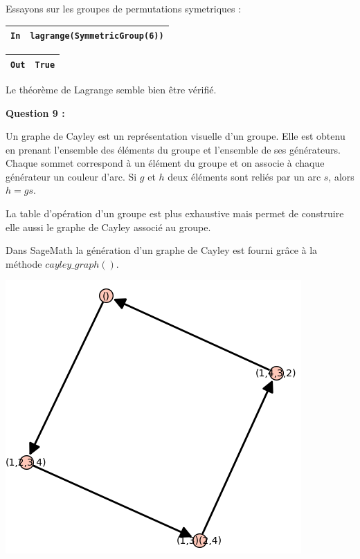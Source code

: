 \documentclass[titlepage]{article}
\begin{document}
    Essayons sur les groupes de permutations symetriques : 

    \begin{tabularx}{11.5cm}{|p{0.60cm}|X|}
        \hline
        \verb|In|
        & 
        \verb|lagrange(SymmetricGroup(6))|
        \\
        \hline
    \end{tabularx}\newline
    \begin{tabularx}{11.5cm}{|p{0.60cm}|X|}
        \hline
        \verb|Out|
        & 
        \verb|True|
        \\
        \hline
    \end{tabularx}\newline

    Le théorème de Lagrange semble bien être vérifié.
    \newline

    \textbf{Question 9 :}

    Un graphe de Cayley est un représentation visuelle d'un groupe. Elle est obtenu en prenant l'ensemble des éléments du groupe et l'ensemble de ses générateurs.
    Chaque sommet correspond à un élément du groupe et on associe à chaque générateur un couleur d'arc. Si $g$ et $h$ deux éléments sont reliés par un arc $s$, alors $h = gs$.

    La table d'opération d'un groupe est plus exhaustive mais permet de construire elle aussi le graphe de Cayley associé au groupe.

    Dans SageMath la génération d'un graphe de Cayley est fourni grâce à la méthode $cayley\_graph()$.

    \begin{center}
        \includegraphics[scale=0.5]{q91.png}
    \end{center}
\end{document}
